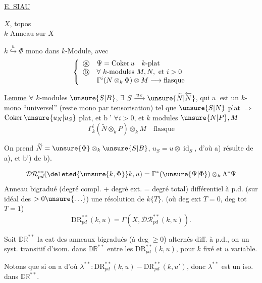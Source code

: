 \uline{E. SIAU}


$X$, topos\\
$k$ Anneau sur $X$

$k\overset{u}{\hookrightarrow}\Phi$ mono dans $k$-Module, avec
\[
\left\{\begin{array}{ll}
\text{\textcircled{a}}&\Psi=\operatorname{Coker}u\quad k\text{-plat}\\
\text{\textcircled{b}}&\forall\ k\text{-modules }M,N,\text{ et }i>0\\
&\Gamma^i(N\otimes_k\Phi)\otimes M\longrightarrow\text{flasque}
\end{array}\right.
\]

\uline{Lemme} $\forall$ $k$-modules $\unsure{S|B}$, $\exists$  $S\overset{u_S}{\longrightarrow}\unsure{\widetilde N|\overleftarrow N}$, qui \textcircled{a} est un $k$-mono ``universel'' (reste mono par tensorisation) tel que $\unsure{S|N}$ plat $\Rightarrow$ $\operatorname{Coker}\unsure{u_N|u_S}$ plat, et \textcircled{b'} $\forall i>0$, et $k$ modules $\unsure{N|P},M$
\[
\Gamma_k^i(\widetilde N\otimes_k P)\otimes_k M\quad\text{flasque}
\]


On prend $\widetilde N=\unsure{\Phi}\otimes_k\unsure{S|B}$, $u_S=u\otimes\operatorname{id}_S$, d'où a) résulte de a), et b') de b).

\[
\mathcal{DR}_{pd}^{**}(\deleted{\unsure{k,\Phi}}k,u)
=\Gamma^*(\unsure{\Psi|\Phi})\otimes_k\Lambda^*\Psi
\]
Anneau bigradué (degré compl. + degré ext. = degré total)
différentiel à p.d. (sur idéal des  $>0\unsure{\ldots}$) une résolution de $k\{T\}$. (où deg ext $T=0$, deg tot $T=1$)
\[
\mathrm{DR}_{pd}^{**}(k,u)=\Gamma(X,\mathcal{DR}_{pd}^{**}(k,u)).
\]

Soit $\mathbb{DR}^{**}$ la cat  des anneaux bigradués (à deg $\geq0$) alternés diff. à p.d.,  on  un syst. transitif d'isom. dans $\mathbb{DR}^{**}$ entre les $\mathrm{DR}_{pd}^{**}(k,u)$, pour $k$ fixé et $u$ variable.

Notons que si on a
d'où
$\lambda^{**}:\mathrm{DR}_{pd}^{**}(k,u)\mathbin{-}\mathrm{DR}_{pd}^{**}(k,u')$,
donc $\lambda^{**}$ est un iso. dans $\mathbb{DR}^{**}$.

